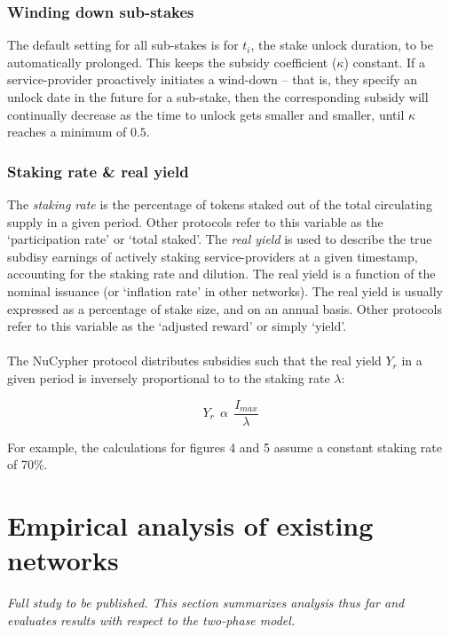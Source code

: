 \documentclass[longbibliography,nofootinbib]{revtex4-1}
\begin{document}
\subsubsection{Winding down sub-stakes}

The default setting for all sub-stakes is for $t_i$, the stake unlock duration, to be automatically prolonged. This keeps the subsidy coefficient ($\kappa$) constant. If a service-provider proactively initiates a wind-down – that is, they specify an unlock date in the future for a sub-stake, then the corresponding subsidy will continually decrease as the time to unlock gets smaller and smaller, until $\kappa$ reaches a minimum of $0.5$.

\subsubsection{Staking rate \& real yield}

The \textit{staking rate} is the percentage of tokens staked out of the total circulating supply in a given period. Other protocols refer to this variable as the `participation rate' or `total staked'. The \textit{real yield} is used to describe the true subdisy earnings of actively staking service-providers at a given timestamp, accounting for the staking rate and dilution. The real yield is a function of the nominal issuance (or `inflation rate' in other networks). The real yield is usually expressed as a percentage of stake size, and on an annual basis. Other protocols refer to this variable as the `adjusted reward' or simply `yield'. 
\\\\
The NuCypher protocol distributes subsidies such that the real yield $Y_r$ in a given period is inversely proportional to to the staking rate $\lambda$: 

\begin{equation}
    Y_r \:\:\alpha\:\: \frac{I_{max}}{\lambda}
\end{equation}

For example, the calculations for figures 4 and 5 assume a constant staking rate of 70\%.

\section{Empirical analysis of existing networks}

\textit{Full study to be published. This section summarizes analysis thus far and evaluates results with respect to the two-phase model.}
\end{document}
